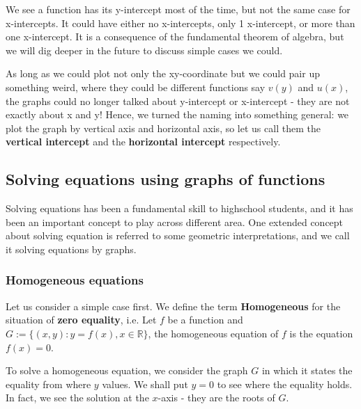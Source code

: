\documentclass[12pt]{article}
\begin{document}
    We see a function has its y-intercept most of the time, but not the same case for x-intercepts. It could have either no x-intercepts, only 1 x-intercept, or more than one x-intercept. It is a consequence of the fundamental theorem of algebra, but we will dig deeper in the future to discuss simple cases we could.

    As long as we could plot not only the xy-coordinate but we could pair up something weird, where they could be different functions say $v(y)$ and $u(x)$, the graphs could no longer talked about y-intercept or x-intercept - they are not exactly about x and y! Hence, we turned the naming into something general: we plot the graph by vertical axis and horizontal axis, so let us call them the \textbf{vertical intercept} and the \textbf{horizontal intercept} respectively.

    \subsection{Solving equations using graphs of functions}

    Solving equations has been a fundamental skill to highschool students, and it has been an important concept to play across different area. One extended concept about solving equation is referred to some geometric interpretations, and we call it solving equations by graphs.

    \subsubsection*{Homogeneous equations}

    Let us consider a simple case first. We define the term \textbf{Homogeneous} for the situation of \textbf{zero equality}, i.e. Let $f$ be a function and $G:=\{(x,y):y=f(x),x\in\mathbb{R}\}$, the homogeneous equation of $f$ is the equation $f(x)=0$.

    To solve a homogeneous equation, we consider the graph $G$ in which it states the equality from where $y$ values. We shall put $y=0$ to see where the equality holds. In fact, we see the solution at the $x$-axis - they are the roots of $G$.
    
    \begin{center}
    \end{center}
\end{document}
